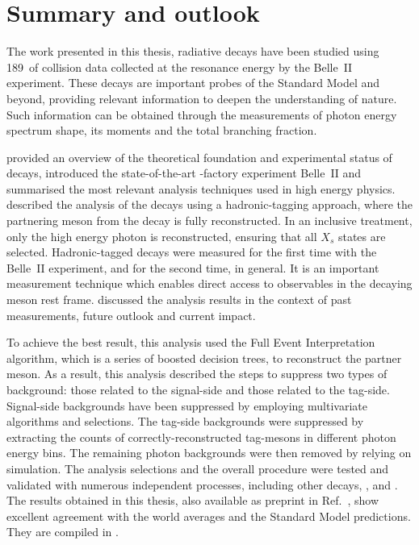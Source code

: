 \chapter{Summary and outlook}\label{ch:summary}

The work presented in this thesis, radiative \BtoXsgamma decays have been studied using 189~\invfb of \epem collision data collected at the \FourS resonance energy by the Belle~II experiment.
These decays are important probes of the Standard Model and beyond, providing relevant information to deepen the understanding of nature.
Such information can be obtained through the measurements of \BtoXsgamma photon energy spectrum shape, its moments and the total branching fraction.

 provided an overview of the theoretical foundation and experimental status of \mbox{\BtoXsgamma} decays, 
introduced the state-of-the-art \B-factory experiment Belle~II and summarised the most relevant analysis techniques used in high energy physics.
 described the analysis
of the \BtoXsgamma decays using a hadronic-tagging approach, where the partnering \B meson from the \FourS decay is fully reconstructed.
In an inclusive treatment, only the high energy photon is reconstructed, ensuring that all $X_s$ states are selected.
Hadronic-tagged \BtoXsgamma decays were measured for the first time with the Belle~II experiment, and for the second time, in general.
It is an important measurement technique which enables direct access to observables in the decaying \B meson rest frame.
 discussed the analysis results in the context of past measurements, future outlook and current impact.

To achieve the best result, this \BtoXsgamma analysis used the Full Event Interpretation algorithm, which is a series of boosted decision trees, to reconstruct the partner \B meson.
As a result, this analysis described the steps to suppress two types of background: those related to the signal-side and those related to the tag-side.
Signal-side backgrounds have been suppressed by employing multivariate algorithms and selections.
The tag-side backgrounds were suppressed by extracting the counts of correctly-reconstructed tag-\B mesons in different photon energy bins.
The remaining photon backgrounds were then removed by relying on simulation.
The analysis selections and the overall procedure were tested and validated with numerous independent processes, including other \B decays, \mbox{\epem\ra\qqbar}, and \mbox{\epem\ra\mumu}.
The results obtained in this thesis, also available as preprint in Ref.~\cite{Belle-II:2022hys}, show excellent agreement with the world averages and the Standard Model predictions.
They are compiled in .

